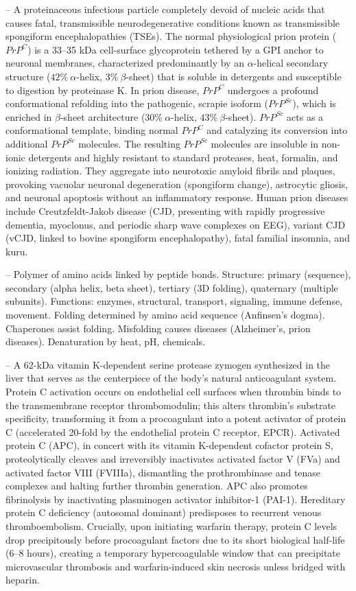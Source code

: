 -- A proteinaceous infectious particle completely devoid of nucleic acids that causes fatal, transmissible neurodegenerative conditions known as transmissible spongiform encephalopathies (TSEs). The normal physiological prion protein ($PrP^C$) is a 33--35 kDa cell-surface glycoprotein tethered by a GPI anchor to neuronal membranes, characterized predominantly by an $\alpha$-helical secondary structure ($42\% \ \alpha$-helix, $3\% \ \beta$-sheet) that is soluble in detergents and susceptible to digestion by proteinase K. In prion disease, $PrP^C$ undergoes a profound conformational refolding into the pathogenic, scrapie isoform ($PrP^{Sc}$), which is enriched in $\beta$-sheet architecture ($30\% \ \alpha$-helix, $43\% \ \beta$-sheet). $PrP^{Sc}$ acts as a conformational template, binding normal $PrP^C$ and catalyzing its conversion into additional $PrP^{Sc}$ molecules. The resulting $PrP^{Sc}$ molecules are insoluble in non-ionic detergents and highly resistant to standard proteases, heat, formalin, and ionizing radiation. They aggregate into neurotoxic amyloid fibrils and plaques, provoking vacuolar neuronal degeneration (spongiform change), astrocytic gliosis, and neuronal apoptosis without an inflammatory response. Human prion diseases include Creutzfeldt-Jakob disease (CJD, presenting with rapidly progressive dementia, myoclonus, and periodic sharp wave complexes on EEG), variant CJD (vCJD, linked to bovine spongiform encephalopathy), fatal familial insomnia, and kuru.

-- Polymer of amino acids linked by peptide bonds. Structure: primary (sequence), secondary (alpha helix, beta sheet), tertiary (3D folding), quaternary (multiple subunits). Functions: enzymes, structural, transport, signaling, immune defense, movement. Folding determined by amino acid sequence (Anfinsen's dogma). Chaperones assist folding. Misfolding causes diseases (Alzheimer's, prion diseases). Denaturation by heat, pH, chemicals.

-- A 62-kDa vitamin K-dependent serine protease zymogen synthesized in the liver that serves as the centerpiece of the body's natural anticoagulant system. Protein C activation occurs on endothelial cell surfaces when thrombin binds to the transmembrane receptor thrombomodulin; this alters thrombin's substrate specificity, transforming it from a procoagulant into a potent activator of protein C (accelerated 20-fold by the endothelial protein C receptor, EPCR). Activated protein C (APC), in concert with its vitamin K-dependent cofactor protein S, proteolytically cleaves and irreversibly inactivates activated factor V (FVa) and activated factor VIII (FVIIIa), dismantling the prothrombinase and tenase complexes and halting further thrombin generation. APC also promotes fibrinolysis by inactivating plasminogen activator inhibitor-1 (PAI-1). Hereditary protein C deficiency (autosomal dominant) predisposes to recurrent venous thromboembolism. Crucially, upon initiating warfarin therapy, protein C levels drop precipitously before procoagulant factors due to its short biological half-life (6--8 hours), creating a temporary hypercoagulable window that can precipitate microvascular thrombosis and warfarin-induced skin necrosis unless bridged with heparin.

